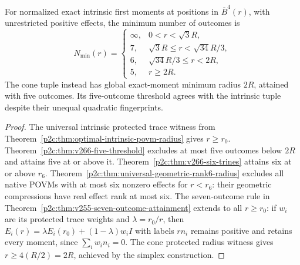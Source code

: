 \documentclass[12pt,a4paper]{article}
\begin{document}
\begin{corollary}
\label{p2c:cor:v266-outcome-count}
For normalized exact intrinsic first moments at positions in
$\overline B^4(r)$, with unrestricted positive effects, the minimum
number of outcomes is
\[
\boxed{N_{\min}(r)=\begin{cases}
\infty,&0<r<\sqrt3R,\\
7,&\sqrt3R\le r<\sqrt{34}R/3,\\
6,&\sqrt{34}R/3\le r<2R,\\
5,&r\ge2R.
\end{cases}}
\]
The cone tuple instead has global exact-moment minimum radius $2R$,
attained with five outcomes. Its five-outcome threshold agrees with the
intrinsic tuple despite their unequal quadratic fingerprints.
\end{corollary}
\begin{proof}
The universal intrinsic protected trace witness from
Theorem~\ref{p2c:thm:optimal-intrinsic-povm-radius} gives $r\ge r_0$.
Theorem~\ref{p2c:thm:v266-five-threshold} excludes at most five
outcomes below $2R$ and attains five at or above it.
Theorem~\ref{p2c:thm:v266-six-trines} attains six at or above $r_6$.
Theorem~\ref{p2c:thm:universal-geometric-rank6-radius} excludes
all native POVMs with at most six nonzero effects for $r<r_6$:
their geometric compressions have real effect rank at most six.
The seven-outcome rule in
Theorem~\ref{p2c:thm:v255-seven-outcome-attainment} extends to all
$r\ge r_0$: if $w_i$ are its protected trace weights and
$\lambda=r_0/r$, then
$E_i(r)=\lambda E_i(r_0)+(1-\lambda)w_iI$ with labels $rn_i$
remains positive and retains every moment, since
$\sum_iw_in_i=0$. The cone protected radius witness gives
$r\ge4(R/2)=2R$, achieved by the simplex construction.
\end{proof}
\end{document}
